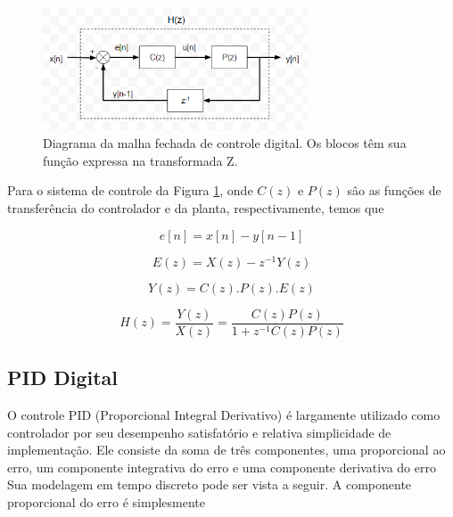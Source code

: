 \begin{figure}[ht]
    \begin{center}
    \includegraphics[width=0.7\textwidth]{figuras/condig.PNG}
    \end{center}
    \caption[Diagrama da malha fechada de controle digital.]{Diagrama da malha fechada de controle digital. Os blocos têm sua função expressa na transformada Z.}
    \label{condig}
\end{figure}

Para o sistema de controle da Figura \ref{condig}, onde $C(z)$ e $P(z)$ sâo as funções de transferência do controlador e da planta, respectivamente, temos que

\begin{equation}
    \label{eq:cd_2}
    e[n] = x[n] - y[n-1]
\end{equation}

\begin{equation}
    \label{eq:cd_3}
    E(z) = X(z) - z^{-1}Y(z)
\end{equation}

\begin{equation}
    \label{eq:cd_4}
    Y(z) = C(z).P(z).E(z)
\end{equation}

\begin{equation}
    \label{eq:cd_5}
    H(z) = \frac{Y(z)}{X(z)} = \frac{C(z)P(z)}{1+z^{-1}C(z)P(z)}
\end{equation}

\subsection{PID Digital}

O controle PID (Proporcional Integral Derivativo) é largamente utilizado como controlador por seu desempenho satisfatório e relativa simplicidade de implementação. Ele consiste da soma de três componentes, uma proporcional ao erro, um componente integrativa do erro e uma componente derivativa do erro Sua modelagem em tempo discreto pode ser vista a seguir. A componente proporcional do erro é simplesmente

